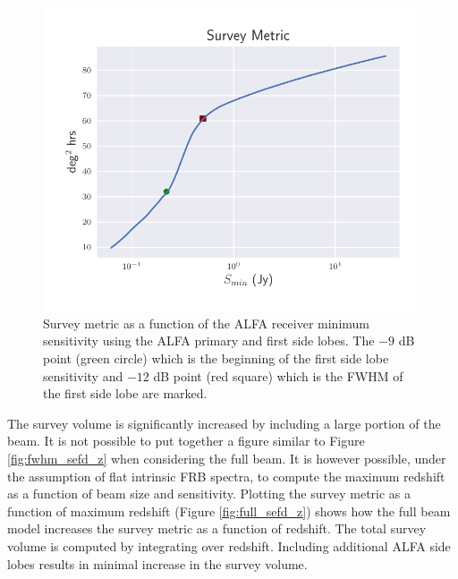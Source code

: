 \documentclass[a4paper,fleqn,usenatbib]{mnras}
\begin{document}
\begin{figure}
    \includegraphics[width=1.0\linewidth]{figures/full_survey_metric_sense.pdf}
    \caption{Survey metric as a function of the ALFA receiver minimum
    sensitivity using the ALFA primary and first side lobes. The $-9$ dB point
    (green circle) which is the beginning of the first side lobe sensitivity and
    $-12$ dB point (red square) which is the FWHM of the first side lobe are
    marked.
    }
    \label{fig:survey_metric_sense}
\end{figure}

The survey volume is significantly increased by including a large
portion of the beam. It is not possible to put together a figure
similar to Figure \ref{fig:fwhm_sefd_z} when considering the full
beam. It is however possible, under the assumption of flat intrinsic
FRB spectra, to compute the maximum redshift as a function of beam
size and sensitivity. Plotting the survey metric as a function of
maximum redshift (Figure \ref{fig:full_sefd_z}) shows how the full
beam model increases the survey metric as a function of redshift. The
total survey volume is computed by integrating over redshift.
Including additional ALFA side lobes results in minimal increase in
the survey volume.
\end{document}
